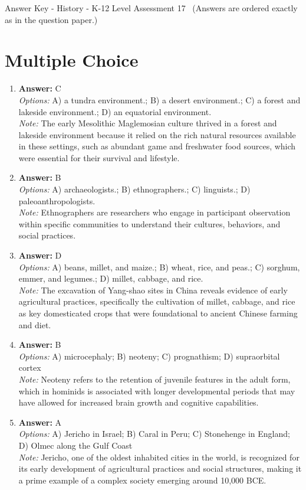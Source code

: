 \documentclass[12pt]{article}
\begin{document}
\begin{center}
Answer Key - History - K-12 Level Assessment 17 \
\small (Answers are ordered exactly as in the question paper.)
\end{center}

\section*{Multiple Choice}
\begin{enumerate}[label=\arabic*.]
\item \textbf{Answer:} C
\\ \textit{Options:} A) a tundra environment.; B) a desert environment.; C) a forest and lakeside environment.; D) an equatorial environment.
\\ \textit{Note:} The early Mesolithic Maglemosian culture thrived in a forest and lakeside environment because it relied on the rich natural resources available in these settings, such as abundant game and freshwater food sources, which were essential for their survival and lifestyle.
\item \textbf{Answer:} B
\\ \textit{Options:} A) archaeologists.; B) ethnographers.; C) linguists.; D) paleoanthropologists.
\\ \textit{Note:} Ethnographers are researchers who engage in participant observation within specific communities to understand their cultures, behaviors, and social practices.
\item \textbf{Answer:} D
\\ \textit{Options:} A) beans, millet, and maize.; B) wheat, rice, and peas.; C) sorghum, emmer, and legumes.; D) millet, cabbage, and rice.
\\ \textit{Note:} The excavation of Yang-shao sites in China reveals evidence of early agricultural practices, specifically the cultivation of millet, cabbage, and rice as key domesticated crops that were foundational to ancient Chinese farming and diet.
\item \textbf{Answer:} B
\\ \textit{Options:} A) microcephaly; B) neoteny; C) prognathism; D) supraorbital cortex
\\ \textit{Note:} Neoteny refers to the retention of juvenile features in the adult form, which in hominids is associated with longer developmental periods that may have allowed for increased brain growth and cognitive capabilities.
\item \textbf{Answer:} A
\\ \textit{Options:} A) Jericho in Israel; B) Caral in Peru; C) Stonehenge in England; D) Olmec along the Gulf Coast
\\ \textit{Note:} Jericho, one of the oldest inhabited cities in the world, is recognized for its early development of agricultural practices and social structures, making it a prime example of a complex society emerging around 10,000 BCE.
\end{enumerate}
\end{document}
